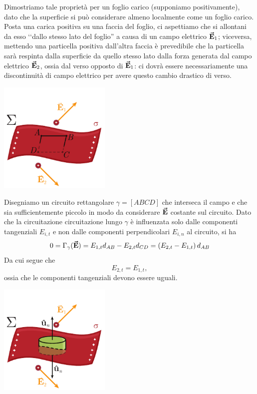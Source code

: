 \begin{demonstration}
	Dimostriamo tale proprietà per un foglio carico (supponiamo positivamente), dato che la superficie si può considerare almeno localmente come un foglio 
	carico.\\
	Posta una carica positiva su una faccia del foglio, ci aspettiamo che si allontani da esso ‘‘dallo stesso lato del foglio'' a causa di un campo elettrico $\vb*{\va{E}}_1$; viceversa, mettendo una particella positiva dall'altra faccia è prevedibile che la particella sarà respinta dalla superficie da quello stesso lato dalla forza generata dal campo elettrico $\vb*{\va{E}}_2$, ossia dal verso opposto di $\vb*{\va{E}}_1$: ci dovrà essere necessariamente una discontinuità di campo elettrico per avere questo cambio drastico di verso.
	\begin{center}
		\includegraphics[width=0.4\textwidth]{images/chp3discontinuita1.pdf}
	\end{center}
	Disegniamo un circuito rettangolare $\gamma=[ABCD]$ che interseca il campo e che sia sufficientemente piccolo in modo da considerare $\vb*{\va{E}}$ costante sul circuito. Dato che la circuitazione circuitazione lungo $\gamma$ è influenzata solo dalle componenti tangenziali $E_{i,t}$ e non dalle componenti perpendicolari $E_{i,n}$ al circuito, si ha
	\begin{equation*}
		0=\Gamma_{\gamma}(\vb*{\va{E}})=E_{1,t}d_{AB}-E_{2,t}d_{CD}=\left(E_{2,t}-E_{1,t}\right)d_{AB}
	\end{equation*}
Da cui segue che
\begin{equation*}
	E_{2,t}=E_{1,t},
\end{equation*}
ossia che le componenti tangenziali devono essere uguali.
\begin{center}
	\includegraphics[width=0.4\textwidth]{images/chp3discontinuita2.pdf}

\end{center}
\end{demonstration}
